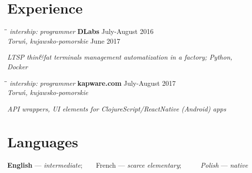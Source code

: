 \documentclass[a4paper]{res}
\begin{document}
\begin{resume}
    \section{Experience}
    \vspace{-0.05in}
    \begin{tabbing}
        \hspace{2.3in}\= \hspace{2.6in}\= \kill
        \textit{intership:} \textsl{programmer}\>
        \textbf{DLabs} \>
        July-August 2016\\
        \> \textsl{Toruń, kujawsko-pomorskie}
        \> June 2017
    \end{tabbing}\vspace{-20pt}
    \hspace{.5in}\textsl{LTSP thin\&fat terminals management automatization in a factory; Python, Docker}
    \vspace{-0.17in}
    \begin{tabbing}
        \hspace{2.3in}\= \hspace{2.6in}\= \kill
        \textit{intership:} \textsl{programmer}\>
        \textbf{kapware.com} \>
        July-August 2017\\
        \> \textsl{Toruń, kujawsko-pomorskie}
    \end{tabbing}\vspace{-17pt}
    \hspace{.5in}\textsl{API wrappers, UI elements for ClojureScript/ReactNative (Android) apps}
    \vspace{-0.17in}
    \section{Languages}
    \vspace{0.05in}
    \textbf{English} — \textsl{intermediate}; ~ ~ 
    French — \textsl{scarce elementary}; ~ ~ ~
    \textit{Polish} — \textsl{native}
    \vspace{-0.18in}

\end{resume}
\end{document}

